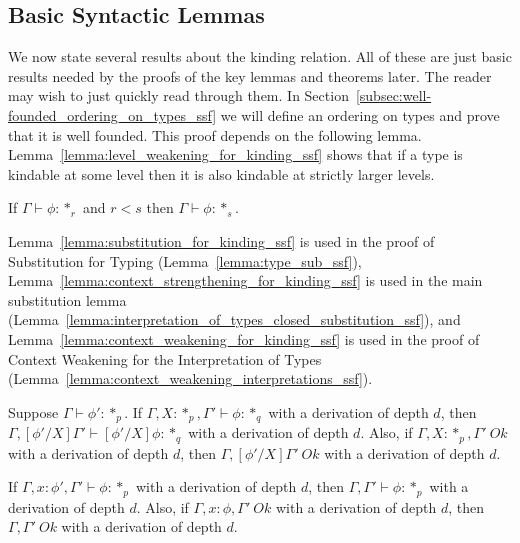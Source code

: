 \subsection{Basic Syntactic Lemmas}
\label{subsec:basic_syntactic_lemmas}
We now state several results about the kinding relation. All of these
are just basic results needed by the proofs of the key lemmas and
theorems later. The reader may wish to just quickly read through them.
In Section~\ref{subsec:well-founded_ordering_on_types_ssf} we will define an
ordering on types and prove that it is well founded.  This proof
depends on the following lemma.
Lemma~\ref{lemma:level_weakening_for_kinding_ssf} shows that if a type
is kindable at some level then it is also kindable at strictly larger
levels.

\begin{lemma}
  If $\Gamma \vdash \phi:*_r$ and $r < s$ then $\Gamma \vdash \phi:*_s$.
  \label{lemma:level_weakening_for_kinding_ssf}
\end{lemma}

\noindent Lemma~\ref{lemma:substitution_for_kinding_ssf} is used in
the proof of Substitution for Typing
(Lemma~\ref{lemma:type_sub_ssf}),
Lemma~\ref{lemma:context_strengthening_for_kinding_ssf} is used in the
main substitution lemma
(Lemma~\ref{lemma:interpretation_of_types_closed_substitution_ssf}),
and Lemma~\ref{lemma:context_weakening_for_kinding_ssf} is used in the
proof of Context Weakening for the Interpretation of Types
(Lemma~\ref{lemma:context_weakening_interpretations_ssf}).

\begin{lemma}
  Suppose $\Gamma \vdash \phi':*_p$.  If $\Gamma,X:*_p,\Gamma' \vdash \phi:*_q$ 
  with a derivation of depth $d$, then $\Gamma,[\phi'/X]\Gamma' \vdash [\phi'/X]\phi:*_q$
  with a derivation of depth $d$.
  Also, if $\Gamma,X:*_p,\Gamma'\ Ok$ with a derivation of depth $d$, then 
  $\Gamma,[\phi'/X]\Gamma'\ Ok$ with a derivation of depth $d$.
  \label{lemma:substitution_for_kinding_ssf}
\end{lemma}

\begin{lemma}
  If $\Gamma,x:\phi',\Gamma' \vdash \phi:*_p$ with a derivation of depth $d$, then 
  $\Gamma,\Gamma' \vdash \phi:*_p$ with a derivation of depth $d$.  Also, if 
  $\Gamma,x:\phi,\Gamma'\ Ok$ with a 
  derivation of depth $d$, then $\Gamma,\Gamma'\ Ok$ with a derivation of depth $d$.
  \label{lemma:context_strengthening_for_kinding_ssf}
\end{lemma}

